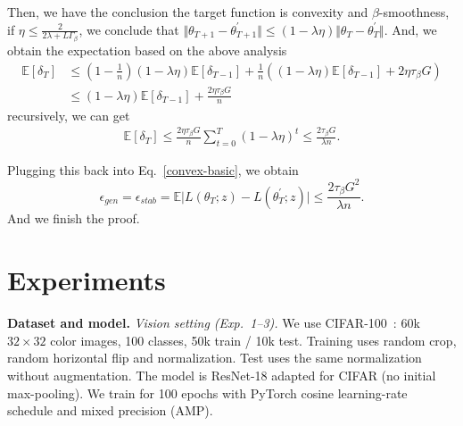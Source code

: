 Then, we have the conclusion the target function is convexity and $\beta$-smoothness, if $\eta \leq \frac{2}{2\lambda+L\Gamma_{\beta}}$, we conclude that $\Vert \theta_{T+1} - \theta_{T+1}^{\prime}\Vert \leq (1-\lambda\eta)\Vert \theta_T- \theta_T^{\prime}\Vert$. And, we obtain the expectation based on the above analysis 
  \begin{equation}
  \begin{aligned}
    \mathbb{E}\left[\delta_{T}\right] &\leq (1-\frac{1}{n})(1-\lambda \eta)\mathbb{E}\left[\delta_{T-1}\right] + \frac{1}{n}\left((1-\lambda \eta)\mathbb{E}\left[\delta_{T-1}\right] + 2\eta\tau_{\beta} G\right)\\
    &\leq (1-\lambda \eta)\mathbb{E}\left[\delta_{T-1}\right] + \frac{2\eta\tau_{\beta} G}{n}
  \end{aligned}
 \end{equation}
recursively, we can get 
    \begin{equation}
     \begin{aligned}
      \mathbb{E}\left[\delta_{T}\right] \leq \frac{2\eta\tau_{\beta} G}{n} \sum_{t=0}^{T}(1-\lambda \eta)^t \leq \frac{2\tau_{\beta}G}{\lambda n}.
     \end{aligned}
    \end{equation}

Plugging this back into Eq.~\eqref{convex-basic}, we obtain
 \begin{equation}\label{eq:2.2.1}
  \epsilon_{gen} = \epsilon_{stab} = \mathbb{E}\vert L(\theta_T;z) - L(\theta^{\prime}_T;z)\vert \leq \frac{2\tau_{\beta}G^2}{\lambda n}.
 \end{equation}
And we finish the proof.

\section{Experiments}\label{Appendix:exp}

\textbf{Dataset and model.}
\emph{Vision setting (Exp.~1--3).}
We use CIFAR-100~\cite{krizhevsky2009learning}: 60k $32{\times}32$ color images, 100 classes, 50k train / 10k test. Training uses random crop, random horizontal flip and normalization. Test uses the same normalization without augmentation. The model is ResNet-18 adapted for CIFAR (no initial max-pooling). We train for 100 epochs with PyTorch cosine learning-rate schedule and mixed precision (AMP).

